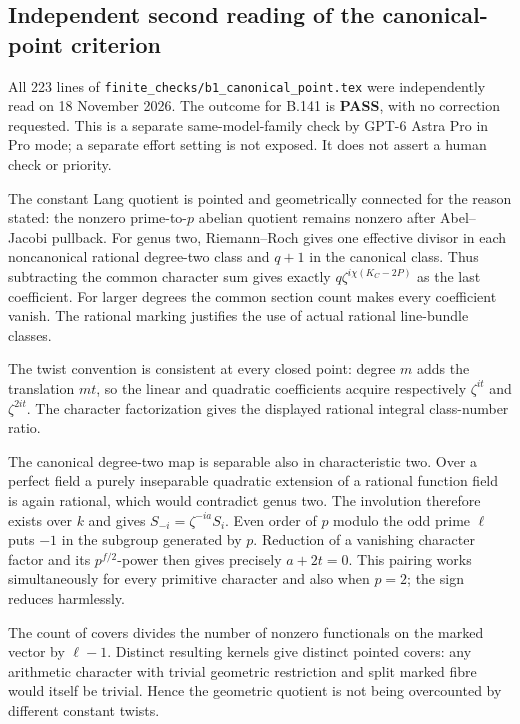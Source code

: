 \subsection*{Independent second reading of the canonical-point criterion}

All 223 lines of \texttt{finite\_checks/b1\_canonical\_point.tex}
were independently read on 18 November 2026.  The outcome for
B.141 is \textbf{PASS}, with no correction requested.  This is
a separate same-model-family check by GPT-6 Astra Pro in Pro
mode; a separate effort setting is not exposed.  It does not
assert a human check or priority.

The constant Lang quotient is pointed and geometrically
connected for the reason stated: the nonzero prime-to-$p$
abelian quotient remains nonzero after Abel--Jacobi pullback.
For genus two, Riemann--Roch gives one effective divisor in
each noncanonical rational degree-two class and $q+1$ in
the canonical class.  Thus subtracting the common character
sum gives exactly $q\zeta^{i\chi(K_C-2P)}$ as the last
coefficient.  For larger degrees the common section count
makes every coefficient vanish.  The rational marking
justifies the use of actual rational line-bundle classes.

The twist convention is consistent at every closed point:
degree $m$ adds the translation $mt$, so the linear and
quadratic coefficients acquire respectively $\zeta^{it}$
and $\zeta^{2it}$.  The character factorization gives the
displayed rational integral class-number ratio.

The canonical degree-two map is separable also in
characteristic two.  Over a perfect field a purely
inseparable quadratic extension of a rational function
field is again rational, which would contradict genus two.
The involution therefore exists over $k$ and gives
$S_{-i}=\zeta^{-ia}S_i$.  Even order of $p$ modulo the odd
prime $\ell$ puts $-1$ in the subgroup generated by $p$.
Reduction of a vanishing character factor and its
$p^{f/2}$-power then gives precisely $a+2t=0$.
This pairing works simultaneously for every primitive
character and also when $p=2$; the sign reduces harmlessly.

The count of covers divides the number of nonzero
functionals on the marked vector by $\ell-1$.  Distinct
resulting kernels give distinct pointed covers: any
arithmetic character with trivial geometric restriction
and split marked fibre would itself be trivial.  Hence
the geometric quotient is not being overcounted by
different constant twists.

